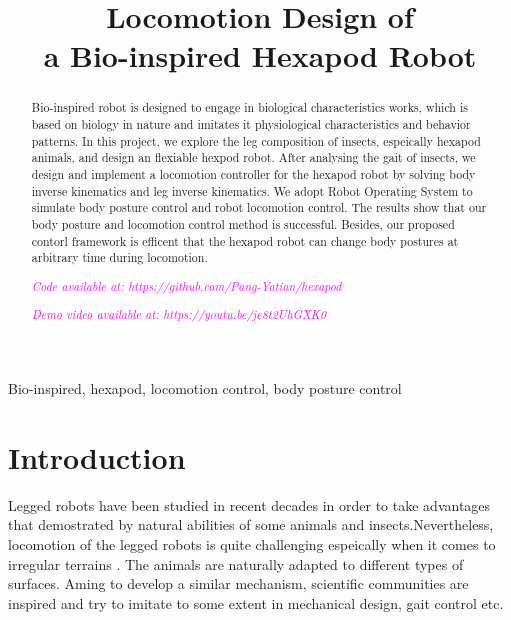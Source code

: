\documentclass[conference]{IEEEtran}
\begin{document}
\title{Locomotion Design of \\a Bio-inspired Hexapod Robot\\}
\author{
}

\maketitle

\begin{abstract}
Bio-inspired robot is designed to engage in biological characteristics works, which is based on biology in nature and imitates it physiological characteristics and behavior
patterns. In this project, we explore the leg composition of insects, espeically hexapod animals, and design an flexiable hexpod robot. After analysing the gait of insects, we  design and implement a locomotion controller for the hexapod robot by solving body inverse kinematics and leg inverse kinematics. We adopt Robot Operating System to simulate body posture control and robot locomotion control. The results show that our body posture and locomotion control method is successful. Besides, our proposed contorl framework is efficent that the hexapod robot can change body postures at arbitrary time during locomotion. 

\textit{\textcolor{magenta}{Code available at: https://github.com/Pang-Yatian/hexapod}}

\textit{\textcolor{magenta}{Demo video available at: https://youtu.be/je8t2UhGXK0}}

\end{abstract}

\begin{IEEEkeywords}
Bio-inspired, hexapod, locomotion control, body posture control
\end{IEEEkeywords}

\section{Introduction}
Legged robots have been studied in recent decades in order to take advantages that demostrated by natural abilities of some animals and insects.Nevertheless, locomotion of the legged robots is quite challenging espeically when it comes to irregular terrains \cite{a2}\cite{a3}. The animals are naturally adapted to different types of surfaces. Aming to develop a similar mechanism, scientific communities are inspired and try to imitate to some extent in mechanical design, gait control etc.
\end{document}
